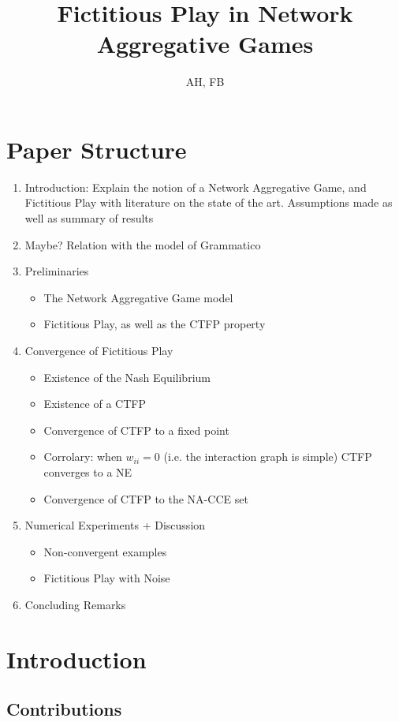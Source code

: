 \documentclass{article}
\title{Fictitious Play in Network Aggregative Games}
\author{AH, FB}
\theoremstyle{definition}
\begin{document}
	
	\maketitle

	\section{Paper Structure}

	\begin{enumerate}
		\item Introduction: Explain the notion of a Network Aggregative Game, and Fictitious Play
		with literature on the state of the art. Assumptions made as well as summary of results
		\item Maybe? Relation with the model of Grammatico
		\item Preliminaries \begin{itemize}
			\item The Network Aggregative Game model
			\item Fictitious Play, as well as the CTFP property
		\end{itemize}
		\item Convergence of Fictitious Play \begin{itemize}
			\item Existence of the Nash Equilibrium
			\item Existence of a CTFP
			\item Convergence of CTFP to a fixed point
			\item Corrolary: when $w_{ii} = 0$ (i.e. the interaction graph is simple) CTFP converges
			to a NE
			\item Convergence of CTFP to the NA-CCE set
		\end{itemize}
		\item Numerical Experiments + Discussion \begin{itemize}
			\item Non-convergent examples
			\item Fictitious Play with Noise
		\end{itemize}
		\item Concluding Remarks
	\end{enumerate}
	
	\newpage
	\section{Introduction}

	\subsection{Contributions}
\end{document}
